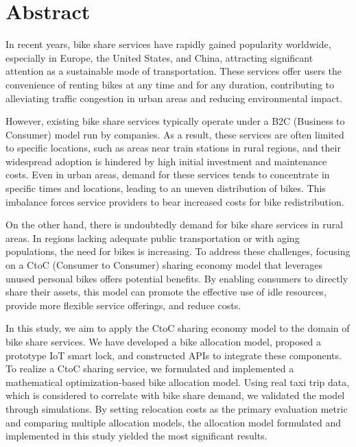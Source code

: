 \section*{Abstract}
    \par In recent years, bike share services have rapidly gained popularity worldwide, especially in Europe, the United States, and China, attracting significant attention as a sustainable mode of transportation. These services offer users the convenience of renting bikes at any time and for any duration, contributing to alleviating traffic congestion in urban areas and reducing environmental impact.
    \par However, existing bike share services typically operate under a B2C (Business to Consumer) model run by companies. As a result, these services are often limited to specific locations, such as areas near train stations in rural regions, and their widespread adoption is hindered by high initial investment and maintenance costs. Even in urban areas, demand for these services tends to concentrate in specific times and locations, leading to an uneven distribution of bikes. This imbalance forces service providers to bear increased costs for bike redistribution.
    \par On the other hand, there is undoubtedly demand for bike share services in rural areas. In regions lacking adequate public transportation or with aging populations, the need for bikes is increasing. To address these challenges, focusing on a CtoC (Consumer to Consumer) sharing economy model that leverages unused personal bikes offers potential benefits. By enabling consumers to directly share their assets, this model can promote the effective use of idle resources, provide more flexible service offerings, and reduce costs.
    \par In this study, we aim to apply the CtoC sharing economy model to the domain of bike share services. We have developed a bike allocation model, proposed a prototype IoT smart lock, and constructed APIs to integrate these components. To realize a CtoC sharing service, we formulated and implemented a mathematical optimization-based bike allocation model. Using real taxi trip data, which is considered to correlate with bike share demand, we validated the model through simulations. By setting relocation costs as the primary evaluation metric and comparing multiple allocation models, the allocation model formulated and implemented in this study yielded the most significant results.
